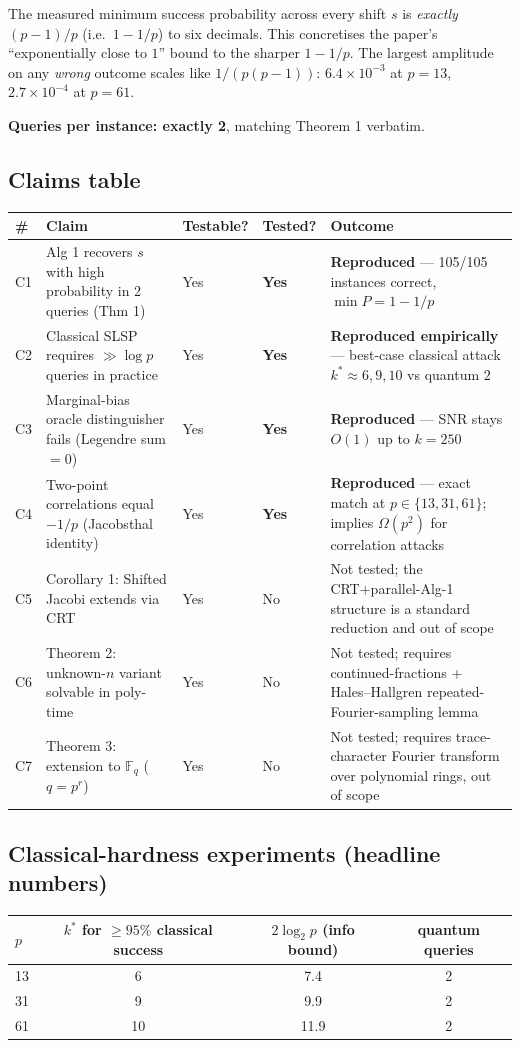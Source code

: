 \documentclass[11pt]{article}
\begin{document}
The measured minimum success probability across every shift $s$ is
\emph{exactly} $(p-1)/p$ (i.e.\ $1 - 1/p$) to six decimals. This
concretises the paper's ``exponentially close to $1$'' bound to the
sharper $1 - 1/p$. The largest amplitude on any \emph{wrong} outcome
scales like $1/(p(p-1))$: $6.4\times10^{-3}$ at $p=13$, $2.7\times10^{-4}$
at $p=61$.

\textbf{Queries per instance: exactly 2}, matching Theorem 1 verbatim.

\subsection{Claims table}
\begin{longtable}{p{}p{}p{}p{}p{}}
\toprule
\# & Claim & Testable? & Tested? & Outcome \\
\midrule
C1 & Alg 1 recovers $s$ with high probability in 2 queries (Thm 1) &
Yes & \textbf{Yes} & \textbf{Reproduced} — 105/105 instances correct, $\min P = 1 - 1/p$ \\
C2 & Classical SLSP requires $\gg\log p$ queries in practice &
Yes & \textbf{Yes} & \textbf{Reproduced empirically} — best-case classical attack $k^\ast \approx 6, 9, 10$ vs quantum $2$ \\
C3 & Marginal-bias oracle distinguisher fails (Legendre sum $=0$) &
Yes & \textbf{Yes} & \textbf{Reproduced} — SNR stays $O(1)$ up to $k=250$ \\
C4 & Two-point correlations equal $-1/p$ (Jacobsthal identity) &
Yes & \textbf{Yes} & \textbf{Reproduced} — exact match at $p\in\{13,31,61\}$; implies $\Omega(p^2)$ for correlation attacks \\
C5 & Corollary 1: Shifted Jacobi extends via CRT &
Yes & No & Not tested; the CRT+parallel-Alg-1 structure is a standard reduction and out of scope \\
C6 & Theorem 2: unknown-$n$ variant solvable in poly-time &
Yes & No & Not tested; requires continued-fractions + Hales--Hallgren repeated-Fourier-sampling lemma \\
C7 & Theorem 3: extension to $\mathbb{F}_q$ ($q=p^r$) &
Yes & No & Not tested; requires trace-character Fourier transform over polynomial rings, out of scope \\
\bottomrule
\end{longtable}

\subsection{Classical-hardness experiments (headline numbers)}
\begin{longtable}{lccc}
\toprule
$p$ & $k^\ast$ for $\geq 95\%$ classical success & $2\log_2 p$ (info bound) & quantum queries \\
\midrule
13 & 6  & 7.4  & 2 \\
31 & 9  & 9.9  & 2 \\
61 & 10 & 11.9 & 2 \\
\bottomrule
\end{longtable}
\end{document}
